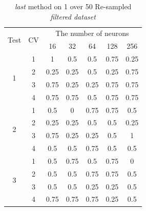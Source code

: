 \documentclass[draft,dvipsnames]{drexel-thesis}
\begin{document}
\begin{thesis}
\begin{table}[!t]
\centering
\caption{{\em last} method on 1 over 50 Re-sampled {\em filtered dataset}}
\label{tbl:last_1_50}
\begin{tabular}{|c|c|c|c|c|c|c|}
\hline
\multirow{2}{*}{Test} & \multirow{2}{*}{CV} & \multicolumn{5}{c|}{The number of neurons}                              \\ \cline{3-7}
                      &                     & 16           & 32           & 64           & 128         & 256          \\ \hline
\multirow{4}{*}{1}    & 1                   & 1            & 0.5          & 0.5          & 0.75        & 0.25         \\ \cline{2-7}
                      & 2                   & 0.25         & 0.25         & 0.5          & 0.25        & 0.75         \\ \cline{2-7}
                      & 3                   & 0.75         & 0.25         & 0.25         & 0.75        & 0.75         \\ \cline{2-7}
                      & 4                   & 0.75         & 0.75         & 0.5          & 0.75        & 0.75         \\ \hline
\multirow{4}{*}{2}    & 1                   & 0.5          & 0            & 0.75         & 0.75        & 0.5          \\ \cline{2-7}
                      & 2                   & 0.25         & 0.25         & 0.5          & 0.5         & 0.25         \\ \cline{2-7}
                      & 3                   & 0.75         & 0.25         & 0.25         & 0.5         & 1            \\ \cline{2-7}
                      & 4                   & 0.5          & 0.5          & 0.75         & 0.5         & 0.5          \\ \hline
\multirow{4}{*}{3}    & 1                   & 0.5          & 0.75         & 0.5          & 0.75        & 0            \\ \cline{2-7}
                      & 2                   & 0.5          & 0.5          & 0.75         & 0.75        & 0.5          \\ \cline{2-7}
                      & 3                   & 0.5          & 0.5          & 0.25         & 0.25        & 0.5          \\ \cline{2-7}
                      & 4                   & 0.75         & 0.75         & 0.75         & 0.25        & 0.5          \\ \hline

\end{tabular}
\end{table}
\end{thesis}
\end{document}
